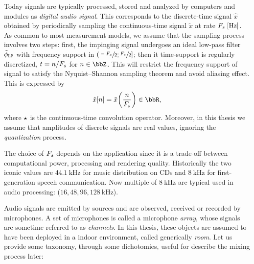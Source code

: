 Today signals are typically processed, stored and analyzed by computers and modules as \textit{digital audio signal}.
This corresponds to the discrete-time signal $\hat{x}$ obtained by periodically sampling the continuous-time signal $\tilde{x}$ at rate $\Fs\;[\si{\Hz}]$.
As common to most measurement models, we assume that the sampling process involves two steps:
first, the impinging signal undergoes an ideal low-pass filter $\lowpassfilter$ with frequency support in $\kintervoc{\sfrac{-\Fs}{2}}{\sfrac{\Fs}{2}}$;
then it time-support is regularly discretized, $t = n/F_s$ for $n \in \Z$.
This will restrict the frequency support of signal to satisfy the Nyquist–Shannon sampling theorem and avoid aliasing effect.
This is expressed by
\begin{equation}
    \discTime[\idxSample]{\mic} = \tilde{x}\kparen{\frac{n}{\Fs}} \in \R
    ,
\end{equation}
where $\star$ is the continuous-time convolution operator.
Moreover, in this thesis we assume that amplitudes of discrete signals are real values, ignoring the \textit{quantization} process.

The choice of $F_s$ depends on the application since it is a trade-off between computational power, processing and rendering quality.
Historically the two iconic values are $\SI{44.1}{\kHz}$ for music distribution on CDs and $\SI{8}{\kHz}$ for first-generation speech communication.
Now multiple of $\SI{8}{\kHz}$ are typical used in audio processing: ($16, 48, 96, \SI{128}{\kHz}$).

\mynewline
Audio signals are emitted by sources and are observed, received or recorded by microphones.
A set of microphones is called a microphone \textit{array}, whose signals are sometime referred to as \textit{channels}.
In this thesis, these objects are assumed to have been deployed in a indoor environment, called generically \textit{room}.
Let us provide some taxonomy, through some dichotomies, useful for describe the mixing process later:

